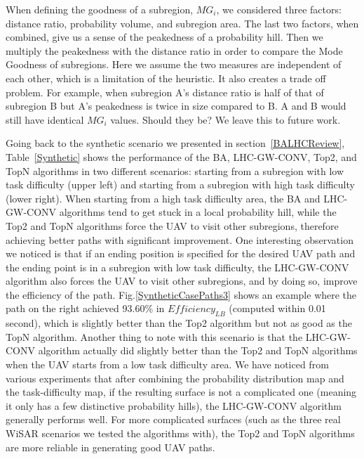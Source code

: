 When defining the goodness of a subregion, $MG_i$, we considered three factors: distance ratio, probability volume, and subregion area. The last two factors, when combined, give us a sense of the peakedness of a probability hill. Then we multiply the peakedness with the distance ratio in order to compare the Mode Goodness of subregions. Here we assume the two measures are independent of each other, which is a limitation of the heuristic. It also creates a trade off problem. For example, when subregion A's distance ratio is half of that of subregion B but A's peakedness is twice in size compared to B. A and B would still have identical $MG_i$ values. Should they be? We leave this to future work.

Going back to the synthetic scenario we presented in section~\ref{BALHCReview}, Table~\ref{Synthetic} shows the performance of the BA, LHC-GW-CONV, Top2, and TopN algorithms in two different scenarios: starting from a subregion with low task difficulty (upper left) and starting from a subregion with high task difficulty (lower right). When starting from a high task difficulty area, the BA and LHC-GW-CONV algorithms tend to get stuck in a local probability hill, while the Top2 and TopN algorithms force the UAV to visit other subregions, therefore achieving better paths with significant improvement. One interesting observation we noticed is that if an ending position is specified for the desired UAV path and the ending point is in a subregion with low task difficulty, the LHC-GW-CONV algorithm also forces the UAV to visit other subregions, and by doing so, improve the efficiency of the path. Fig.\ref{SyntheticCasePaths3} shows an example where the path on the right achieved 93.60\% in $\mathit{Efficiency_{LB}}$ (computed within 0.01 second), which is slightly better than the Top2 algorithm but not as good as the TopN algorithm. Another thing to note with this scenario is that the LHC-GW-CONV algorithm actually did slightly better than the Top2 and TopN algorithms when the UAV starts from a low task difficulty area. We have noticed from various experiments that after combining the probability distribution map and the task-difficulty map, if the resulting surface is not a complicated one (meaning it only has a few distinctive probability hills), the LHC-GW-CONV algorithm generally performs well. For more complicated surfaces (such as the three real WiSAR scenarios we tested the algorithms with), the Top2 and TopN algorithms are more reliable in generating good UAV paths. 


